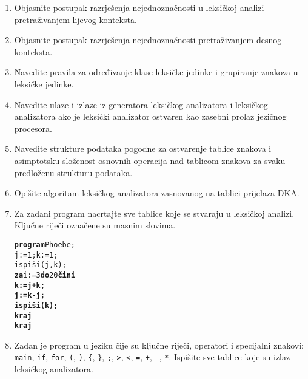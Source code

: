 \documentclass[times, 12pt, utf8]{book}
\begin{document}
\begin{enumerate}[resume]
\item
Objasnite postupak razrješenja nejednoznačnosti u leksičkoj analizi pretraživanjem lijevog konteksta. \cite[str.~63-64]{udzbenik}

\item
Objasnite postupak razrješenja nejednoznačnosti pretraživanjem desnog konteksta. \cite[str.~63-64]{udzbenik}

\item
Navedite pravila za određivanje klase leksičke jedinke i grupiranje znakova u leksičke jedinke. \cite[str.~57-58]{udzbenik}

\item
Navedite ulaze i izlaze iz generatora leksičkog analizatora i leksičkog analizatora ako je leksički analizator ostvaren kao zasebni prolaz jezičnog procesora. \cite[str.~53]{udzbenik}

\item
Navedite strukture podataka pogodne za ostvarenje tablice znakova i asimptotsku složenost osnovnih operacija nad tablicom znakova za svaku predloženu strukturu podataka. \cite[str.~50-52]{udzbenik}

\item
Opišite algoritam leksičkog analizatora zasnovanog na tablici prijelaza DKA. \cite[str.~58-60]{udzbenik}

\item 
Za zadani program nacrtajte sve tablice koje se stvaraju u leksičkoj analizi.
Ključne riječi označene su masnim slovima. \cite[str.~51]{udzbenik} \cite{auditorne}

\begin{alltt}
\textbf{program} Phoebe;
  j:=1; k:=1;
  ispiši (j,k);
  \textbf{za} i:=3 \textbf{do} 20 \bf{čini}
    k:=j+k;
    j:=k-j;
    ispiši (k);
  \textbf{kraj}
\textbf{kraj}
\end{alltt}

\item
Zadan je program u jeziku čije su ključne riječi, operatori i specijalni znakovi: \verb|main|, \verb|if|, \verb|for|, \verb|(|, \verb|)|, \verb|{|, \verb|}|, \verb|;|, \verb|>|, \verb|<|, \verb|=|, \verb|+|, \verb|-|, \verb|*|.
Ispišite sve tablice koje su izlaz leksičkog analizatora. \cite[str.~51]{udzbenik} \cite{auditorne}


\end{enumerate}
\end{document}
